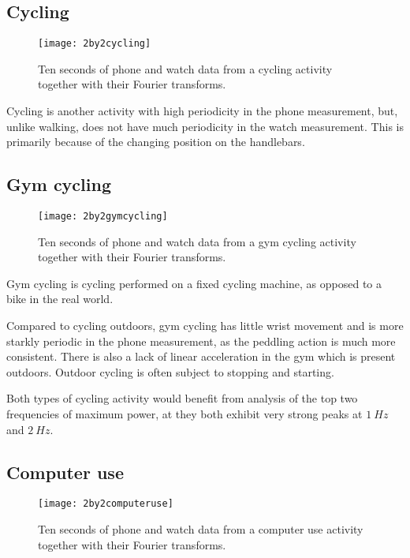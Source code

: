     \subsection{Cycling}
      \begin{figure}[!th]
        \centering
        \texttt{[image: 2by2cycling]}
        \caption[Cycling sample]{Ten seconds of phone and watch data from a cycling activity together with their Fourier transforms.}
        \label{fig:2by2cycling}
      \end{figure}
      Cycling is another activity with high periodicity in the phone measurement, but, unlike walking, does not have much periodicity in the watch measurement. This is primarily because of the changing position on the handlebars.
    \pagebreak[4]
    \subsection{Gym cycling}
      \begin{figure}[!th]
        \centering
        \texttt{[image: 2by2gymcycling]}
        \caption[Gym cycling sample]{Ten seconds of phone and watch data from a gym cycling activity together with their Fourier transforms.}
        \label{fig:2by2gymcycling}
      \end{figure}
      
      Gym cycling is cycling performed on a fixed cycling machine, as opposed to a bike in the real world.
      
      Compared to cycling outdoors, gym cycling has little wrist movement and is more starkly periodic in the phone measurement, as the peddling action is much more consistent. There is also a lack of linear acceleration in the gym which is present outdoors. Outdoor cycling is often subject to stopping and starting.
      
      Both types of cycling activity would benefit from analysis of the top two frequencies of maximum power, at they both exhibit very strong peaks at $1~\si{Hz}$ and $2~\si{Hz}$.
      
      
    \pagebreak[4]
    \subsection{Computer use}
      \begin{figure}[!th]
        \centering
        \texttt{[image: 2by2computeruse]}
        \caption[Computer use sample]{Ten seconds of phone and watch data from a computer use activity together with their Fourier transforms.}
        \label{fig:2by2computeruse}
      \end{figure}
      
